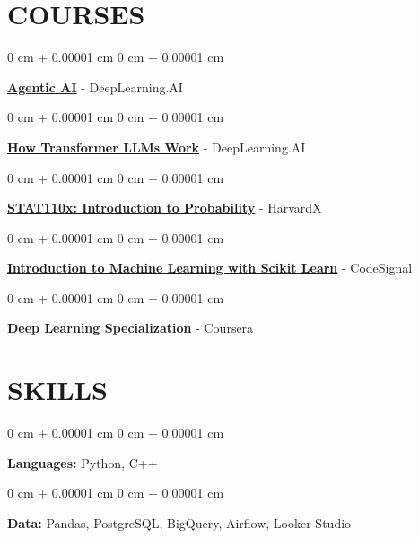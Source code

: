 \documentclass[10pt, letterpaper]{article}
\newenvironment{onecolentry}{
    \begin{adjustwidth}{
        0 cm + 0.00001 cm
    }{
        0 cm + 0.00001 cm
    }
}{
    \end{adjustwidth}
} %
\begin{document}
    \section{COURSES}
        \begin{onecolentry}
            \href{https://learn.deeplearning.ai/certificates/ce11af1e-7a25-4f02-a0dc-164c144570de?usp=sharing}{\textbf{Agentic AI}} - DeepLearning.AI
        \end{onecolentry}

        \vspace{0.10 cm}
        \begin{onecolentry}
            \href{https://learn.deeplearning.ai/accomplishments/e4b8ec62-0ff5-481d-9536-2c43a34fda89?usp=sharing}{\textbf{How Transformer LLMs Work}} - DeepLearning.AI
        \end{onecolentry}

        \vspace{0.10 cm}
        \begin{onecolentry}
            \href{https://courses.edx.org/certificates/ca67a160161144b7b506766e49c9acbd}{\textbf{STAT110x: Introduction to Probability}} - HarvardX
        \end{onecolentry}

        \vspace{0.10 cm}
        \begin{onecolentry}
            \href{https://codesignal.com/learn/certificates/cm8zkzpup00a1iu0jxois4bml/course-paths/49}{\textbf{Introduction to Machine Learning with Scikit Learn}} - CodeSignal
        \end{onecolentry}

        \vspace{0.10 cm}
        \begin{onecolentry}
            \href{https://www.coursera.org/account/accomplishments/specialization/certificate/ZFHHA89GSXHC}{\textbf{Deep Learning Specialization}} - Coursera
        \end{onecolentry}

    \vspace{5 pt - 0.3 cm}
    \section{SKILLS}
        \begin{onecolentry}
            \textbf{Languages:} Python, C++
        \end{onecolentry}

        \vspace{0.10 cm}
        \begin{onecolentry}
            \textbf{Data:} Pandas, PostgreSQL, BigQuery, Airflow, Looker Studio
        \end{onecolentry}
\end{document}
